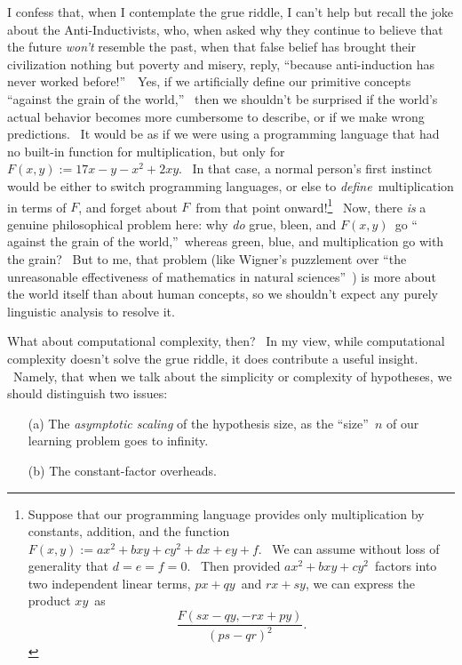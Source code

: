 \documentclass[12pt,onecolumn]{article}%
\begin{document}
I confess that, when I contemplate the grue riddle, I can't help but recall
the joke about the Anti-Inductivists, who, when asked why they continue to
believe that the future \textit{won't} resemble the past, when that false
belief has brought their civilization nothing but poverty and misery, reply,
\textquotedblleft because anti-induction has never worked
before!\textquotedblright\ \ Yes, if we artificially define our primitive
concepts \textquotedblleft against the grain of the world,\textquotedblright%
\ then we shouldn't be surprised if the world's actual behavior becomes more
cumbersome to describe, or if we make wrong predictions. \ It would be as if
we were using a programming language that had no built-in function for
multiplication, but only for $F\left(  x,y\right)  :=17x-y-x^{2}+2xy$. \ In
that case, a normal person's first instinct would be either to switch
programming languages, or else to \textit{define}\ multiplication in terms of
$F$, and forget about $F$\ from that point onward!\footnote{Suppose that our
programming language provides only multiplication by constants, addition, and
the function $F\left(  x,y\right)  :=ax^{2}+bxy+cy^{2}+dx+ey+f$. \ We can
assume without loss of generality that $d=e=f=0$. \ Then provided
$ax^{2}+bxy+cy^{2}$\ factors into two independent linear terms, $px+qy$\ and
$rx+sy$, we can express the product $xy$\ as%
\[
\frac{F\left(  sx-qy,-rx+py\right)  }{\left(  ps-qr\right)  ^{2}}.
\]
} \ Now, there \textit{is} a genuine philosophical problem here: why
\textit{do} grue, bleen, and $F\left(  x,y\right)  $\ go \textquotedblleft
against the grain of the world,\textquotedblright\ whereas green, blue, and
multiplication go with the grain? \ But to me, that problem (like Wigner's
puzzlement over \textquotedblleft the unreasonable effectiveness of
mathematics in natural sciences\textquotedblright\ \cite{wigner}) is more
about the world itself than about human concepts, so we shouldn't expect any
purely linguistic analysis to resolve it.

What about computational complexity, then? \ In my view, while computational
complexity doesn't solve the grue riddle, it does contribute a useful insight.
\ Namely, that when we talk about the simplicity or complexity of hypotheses,
we should distinguish two issues:

\begin{enumerate}
\item[(a)] The \textit{asymptotic scaling} of the hypothesis size, as the
\textquotedblleft size\textquotedblright\ $n$ of our learning problem goes to infinity.

\item[(b)] The constant-factor overheads.
\end{enumerate}
\end{document}
